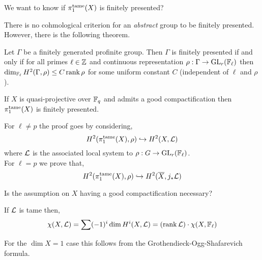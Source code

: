 \documentclass[12pt]{article}
\begin{document}
\begin{rmk}
We want to know if $\pi_1^{\mathrm{tame}}(X)$ is finitely presented? 
\end{rmk}

\begin{rmk}
There is no cohmological criterion for an \textit{abstract} group to be finitely presented. However, there is the following theorem.
\end{rmk}

\begin{theorem}[Lubotzky]
Let $\Gamma$ be a finitely generated profinite group. Then $\Gamma$ is finitely presented if and only if for all primes $\ell \in \mathbb{Z}$ and continuous representation $\rho : \Gamma \to \mathrm{GL}_r(\mathbb{F}_\ell)$ then $\dim_{\mathbb{F}_\ell} H^2(\Gamma, \rho) \le C \operatorname{\mathrm{rank}}{\rho}$ for some uniform constant $C$ (independent of $\ell$ and $\rho$). 
\end{theorem}

\begin{theorem}
If $X$ is quasi-projective over $\mathbb{F}_q$ and admits a good compactification then $\pi_1^{\mathrm{tame}}(X)$ is finitely presented. 
\end{theorem}

\begin{rmk}
For $\ell \neq p$ the proof goes by considering,
\[ H^2(\pi_1^{\mathrm{tame}}(X), \rho) \hookrightarrow H^2(X, \mathcal{L}) \]
where $\mathcal{L}$ is the associated local system to $\rho : G \to \mathrm{GL}_r(\mathbb{F}_{\ell})$. 
\bigskip\\
For $\ell = p$ we prove that,
\[ H^2(\pi_1^{\mathrm{tame}}(X), \rho) \hookrightarrow H^2(\overline{X}, j_* \mathcal{L}) \]
\end{rmk}

\begin{rmk}
Is the assumption on $X$ having a good compactification necessary? 
\end{rmk}

\begin{lemma}[Delgine]
If $\mathcal{L}$ is tame then,
\[ \chi(X, \mathcal{L}) = \sum (-1)^i \dim H^i(X, \mathcal{L}) = (\operatorname{\mathrm{rank}}{\mathcal{L}}) \cdot \chi(X, \mathbb{F}_\ell) \]
\end{lemma}

\begin{rmk}
For the $\dim{X} = 1$ case this follows from the Grothendieck-Ogg-Shafarevich formula.
\end{rmk}
\end{document}
